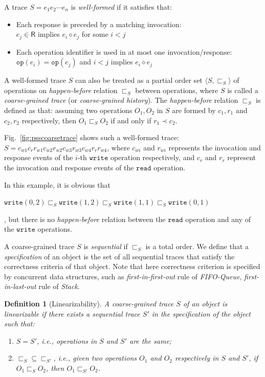 \documentclass[runningheads]{llncs}
\newcommand{\eresp}{\mathsf{R}}
\newcommand{\pair}[1]{{\langle{#1}\rangle}}
\newtheorem{myDef}{Definition}
\newcommand{\wri}{\mathtt{write}}
\newcommand{\rea}{\mathtt{read}}
\newcommand{\hb}{\textit{happen-before }}
\begin{document}
 A trace $S = e_1e_2\cdots e_n$ is \textit{well-formed} if it satisfies that:
\begin{itemize}
  \item Each response is preceded by a matching invocation:\\
  $e_j\in \eresp$ implies $e_i \diamond e_j$ for some $i<j$
  \item Each operation identifier is used in at most one invocation/response:\\
  $\mathtt{op}(e_i)=\mathtt{op}(e_j)$ and $i<j$ implies $e_i \diamond e_j$
\end{itemize}
 A well-formed trace $S$ can also be treated as a partial order set $\pair{S,\sqsubset_S}$ of operations on \textit{happen-before}  relation $\sqsubset_S$ between operations, where $S$ is called a \textit{coarse-grained trace} (or \textit{coarse-grained history}). The \textit{happen-before} relation $\sqsubset_S$ is defined as that: assuming two operations $O_1,O_2$ in $S$ are formed by $c_1,r_1$ and $c_2,r_2$ respectively, then $O_1\sqsubset_S O_2$ if and only if $r_1\prec c_2$.

\begin{example}
Fig.~\ref{fig:psscoarsetrace} shows such a well-formed trace:
$S = c_{w1}c_rr_{w1}c_{w2}r_{w2}c_{w3}r_{w3}c_{w4}r_{r}r_{w4}$, where $c_{wi}$ and $r_{wi}$
represents the invocation and response events of the $i$-th $\mathtt{write}$ operation respectively, and
$c_r$ and $r_r$ represent the invocation and response events of the $\mathtt{read}$ operation.

In this example, it is obvious that \begin{small}$\wri(0,2)\sqsubset_S \wri(1,2)\sqsubset_S \wri(1,1)\sqsubset_S \wri(0,1)$\end{small}, 
but there is no \hb  
relation between the $\rea$ operation and any of the $\wri$ operations.

\end{example}




A coarse-grained trace $S$ is \textit{sequential} if $\sqsubset_S$ is a total order. 
We define that a \textit{specification} of an object is the set of all sequential traces that satisfy the correctness criteria of that object. 
Note that here correctness criterion is specified by concurrent data structures, such as \textit{first-in-first-out} rule of \textit{FIFO-Queue}, \textit{first-in-last-out} rule of \textit{Stack}.

\begin{myDef}[Linearizability]\label{def:linearizability}
A coarse-grained trace $S$ of an object is linearizable if there exists a sequential trace $S'$ in the specification of the object such that:
\begin{enumerate}
  \item $S = S'$, i.e., operations in $S$ and $S'$ are the same;
  \item $\sqsubset_S \subseteq \sqsubset_{S'}$, i.e., given two operations $O_1$ and $O_2$ respectively in $S$ and $S'$, if $O_1\sqsubset_S O_2$, then $O_1\sqsubset_{S'} O_2$.
\end{enumerate}
\end{myDef}
\end{document}
